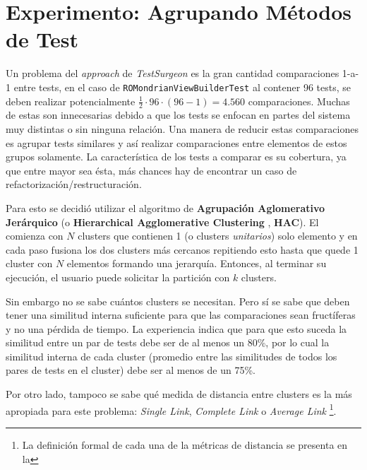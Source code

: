 
\chapter{Experimento: Agrupando Métodos de Test}

\par Un problema del \emph{approach} de \emph{TestSurgeon} es la gran cantidad  comparaciones 1-a-1 entre tests, en el caso de {\tt ROMondrianViewBuilderTest} al contener 96 tests, se deben realizar potencialmente $\frac{1}{2} \cdot 96 \cdot (96-1) = 4.560$ comparaciones. Muchas de estas son innecesarias debido a que los tests se enfocan en partes del sistema muy distintas o sin ninguna relación. Una manera de reducir estas comparaciones es agrupar tests similares y así realizar comparaciones entre elementos de estos grupos solamente. La característica de los tests a comparar es su cobertura, ya que entre mayor sea ésta, más chances hay de encontrar un caso de refactorización/restructuración. 

\par Para esto se decidió utilizar el algoritmo de \textbf{Agrupación Aglomerativo Jerárquico} (o \textbf{Hierarchical Agglomerative Clustering }, \textbf{HAC}). El comienza con $N$ clusters que contienen 1 (o clusters \textit{unitarios}) solo elemento y en cada paso fusiona los dos clusters más cercanos repitiendo esto hasta que quede 1 cluster con $N$ elementos formando una jerarquía. Entonces, al terminar su ejecución, el usuario puede solicitar la partición con $k$ clusters. 

\par Sin embargo no se sabe cuántos clusters se necesitan. Pero sí se sabe que  deben tener una similitud interna suficiente para que las comparaciones sean fructíferas y no una pérdida de tiempo. La experiencia indica que para que esto suceda la similitud entre un par de tests debe ser de al menos un 80\%, por lo cual la similitud interna de cada cluster (promedio entre las similitudes de todos los pares de tests en el cluster) debe ser al menos de un 75\%. 

\par Por otro lado, tampoco se sabe qué medida de distancia entre clusters es la más apropiada para este problema: \emph{Single Link}, \emph{Complete Link} o \emph{Average Link} \footnote{La definición formal de cada una de la métricas de distancia se presenta en la }.  

